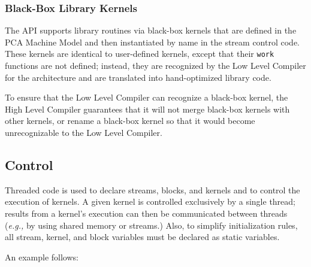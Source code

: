 \callc
\makeline

\subsubsection{Black-Box Library Kernels}
\label{sec:kernelllc}

The API supports library routines via black-box kernels that are
defined in the PCA Machine Model and then instantiated by name in the
stream control code.  These kernels are identical to user-defined
kernels, except that their {\tt work} functions are not defined;
instead, they are recognized by the Low Level Compiler for the
architecture and are translated into hand-optimized library code.

To ensure that the Low Level Compiler can recognize a black-box
kernel, the High Level Compiler guarantees that it will not merge
black-box kernels with other kernels, or rename a black-box kernel so
that it would become unrecognizable to the Low Level Compiler.

\subsection{Control}
\label{sec:control}

Threaded code is used to declare streams, blocks, and kernels and to
control the execution of kernels.  A given kernel is controlled
exclusively by a single thread; results from a kernel's execution can
then be communicated between threads ({\it e.g.,} by using shared
memory or streams.)  Also, to simplify initialization rules, all
stream, kernel, and block variables must be declared as static
variables.

An example follows:

